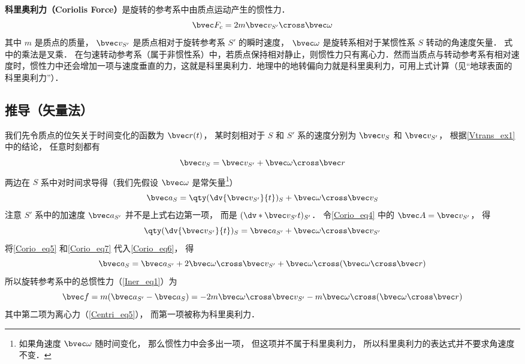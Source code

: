 

\textbf{科里奥利力（Coriolis Force）}是旋转的参考系中由质点运动产生的惯性力．
\begin{equation}
\bvec F_c = 2m \bvec v_{S'} \cross \bvec \omega
\end{equation}
其中 $m$ 是质点的质量， $\bvec v_{S'}$ 是质点相对于旋转参考系 $S'$ 的瞬时速度， $\bvec\omega$ 是旋转系相对于某惯性系 $S$ 转动的角速度矢量．%
式中的乘法是叉乘．
在匀速转动参考系（属于非惯性系）中，若质点保持相对静止，则惯性力只有离心力．然而当质点与转动参考系有相对速度时，惯性力中还会增加一项与速度垂直的力，这就是科里奥利力．地理中的地转偏向力就是科里奥利力，可用上式计算（见“地球表面的科里奥利力”）．

\subsection{推导（矢量法）}

我们先令质点的位矢关于时间变化的函数为 $\bvec r(t)$， 某时刻相对于 $S$ 和 $S'$ 系的速度分别为 $\bvec v_{S}$ 和 $\bvec v_{S'}$， 根据\autoref{Vtrans_ex1} 中的结论， 任意时刻都有
\begin{equation}\label{Corio_eq5}
\bvec v_{S} = \bvec v_{S'} + \bvec\omega\cross\bvec r
\end{equation}
两边在 $S$ 系中对时间求导得（我们先假设 $\bvec \omega$ 是常矢量\footnote{如果角速度 $\bvec \omega$ 随时间变化， 那么惯性力中会多出一项， 但这项并不属于科里奥利力， 所以科里奥利力的表达式并不要求角速度不变．}）
\begin{equation}\label{Corio_eq6}
\bvec a_{S} = \qty(\dv{\bvec v_{S'}}{t})_{S} + \bvec\omega\cross\bvec v_{S}
\end{equation}
注意 $S'$ 系中的加速度 $\bvec a_{S'}$ 并不是上式右边第一项， 而是 $(\dv*{\bvec v_{S'}}{t})_{S'}$． 令\autoref{Corio_eq4} 中的 $\bvec A = \bvec v_{S'}$， 得
\begin{equation}\label{Corio_eq7}
\qty(\dv{\bvec v_{S'}}{t})_{S} = \bvec a_{S'} + \bvec\omega\cross\bvec v_{S'}
\end{equation}
将\autoref{Corio_eq5} 和\autoref{Corio_eq7} 代入\autoref{Corio_eq6}， 得
\begin{equation}
\bvec a_{S} = \bvec a_{S'} + 2\bvec\omega\cross\bvec v_{S'} + \bvec\omega\cross(\bvec\omega\cross\bvec r)
\end{equation}
所以旋转参考系中的总惯性力（\autoref{Iner_eq1}）为
\begin{equation}
\bvec f = m(\bvec a_{S'} - \bvec a_{S}) = -2m\bvec\omega\cross\bvec v_{S'} - m\bvec\omega\cross(\bvec\omega\cross\bvec r)
\end{equation}
其中第二项为离心力（\autoref{Centri_eq5}）， 而第一项被称为科里奥利力．

